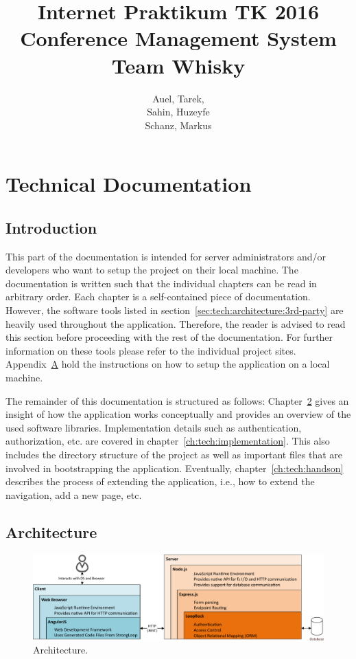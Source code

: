\documentclass[nochapterpage,nopartpage,noheadingspace,numbersubsubsec,bigchapter,colorback,accentcolor=tud9c,10pt]{tudreport}
\title{Internet Praktikum TK 2016\\ Conference Management System\\ Team Whisky}
\subtitle{Auel, Tarek,\\ Sahin, Huzeyfe\\ Schanz, Markus}
\begin{document}
\maketitle
\tableofcontents



\part{Technical Documentation}
\label{part:tech}

  \chapter{Introduction}
  \label{ch:tech:intro}

    This part of the documentation is intended for server administrators and/or developers who want to setup the project on their local machine. The documentation is written such that the individual chapters can be read in arbitrary order. Each chapter is a self-contained piece of documentation. However, the software tools listed in section~\ref{sec:tech:architecture:3rd-party} are heavily used throughout the application. Therefore, the reader is advised to read this section before proceeding with the rest of the documentation. For further information on these tools please refer to the individual project sites. Appendix~\hyperref[ch:appendix:setup]{A} hold the instructions on how to setup the application on a local machine.

    The remainder of this documentation is structured as follows: Chapter~\ref{ch:tech:architecture} gives an insight of how the application works conceptually and provides an overview of the used software libraries. Implementation details such as authentication, authorization, etc. are covered in chapter~\ref{ch:tech:implementation}. This also includes the directory structure of the project as well as important files that are involved in bootstrapping the application. Eventually, chapter~\ref{ch:tech:handson} describes the process of extending the application, i.e., how to extend the navigation, add a new page, etc.

  \chapter{Architecture}
  \label{ch:tech:architecture}

        \begin{figure}[!ht]
            \centering
            \includegraphics[width=\textwidth]{architecture-horizontal}
            \caption{Architecture.}
            \label{fig:architecture}
        \end{figure}
\end{document}
